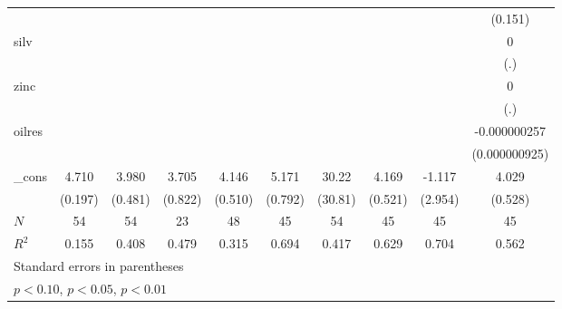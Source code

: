 {\begin{tabular}{l*{9}{c}}
            &                     &                     &                     &                     &                     &                     &                     &                     &     (0.151)         \\
[1em]
silv        &                     &                     &                     &                     &                     &                     &                     &                     &           0         \\
            &                     &                     &                     &                     &                     &                     &                     &                     &         (.)         \\
[1em]
zinc        &                     &                     &                     &                     &                     &                     &                     &                     &           0         \\
            &                     &                     &                     &                     &                     &                     &                     &                     &         (.)         \\
[1em]
oilres      &                     &                     &                     &                     &                     &                     &                     &                     &-0.000000257         \\
            &                     &                     &                     &                     &                     &                     &                     &                     &(0.000000925)         \\
[1em]
\_cons      &       4.710\sym{***}&       3.980\sym{***}&       3.705\sym{***}&       4.146\sym{***}&       5.171\sym{***}&       30.22         &       4.169\sym{***}&      -1.117         &       4.029\sym{***}\\
            &     (0.197)         &     (0.481)         &     (0.822)         &     (0.510)         &     (0.792)         &     (30.81)         &     (0.521)         &     (2.954)         &     (0.528)         \\
\hline
\(N\)       &          54         &          54         &          23         &          48         &          45         &          54         &          45         &          45         &          45         \\
\(R^{2}\)   &       0.155         &       0.408         &       0.479         &       0.315         &       0.694         &       0.417         &       0.629         &       0.704         &       0.562         \\
\hline\hline
\multicolumn{10}{l}{\footnotesize Standard errors in parentheses}\\
\multicolumn{10}{l}{\footnotesize \sym{*} \(p<0.10\), \sym{**} \(p<0.05\), \sym{***} \(p<0.01\)}\\
\end{tabular}
}
